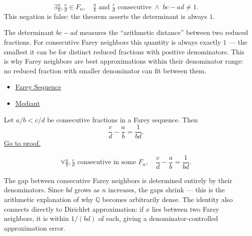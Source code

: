 \begin{remark*}
\[
\exists \tfrac{a}{b}, \tfrac{c}{d} \in F_n,\quad
\tfrac{a}{b} \text{ and } \tfrac{c}{d} \text{ consecutive}
\;\land\; bc - ad \neq 1.
\]
This negation is false: the theorem asserts the determinant is always $1$.
\end{remark*}

\begin{remark*}[Interpretation]
The determinant $bc - ad$ measures the ``arithmetic distance'' between two
reduced fractions.  For consecutive Farey neighbors this quantity is always
exactly $1$ --- the smallest it can be for distinct reduced fractions with
positive denominators.  This is why Farey neighbors are best approximations
within their denominator range: no reduced fraction with smaller denominator
can fit between them.
\end{remark*}

\begin{dependencies}
\begin{itemize}
  \item \hyperref[def:farey-sequence]{Farey Sequence}
  \item \hyperref[def:mediant]{Mediant}
\end{itemize}
\end{dependencies}

\begin{theorem}
\label{thm:farey-gap}
Let $a/b < c/d$ be consecutive fractions in a Farey sequence.  Then
\[
\frac{c}{d} - \frac{a}{b} = \frac{1}{bd}.
\]
\hyperref[prf:farey-gap]{Go to proof.}
\end{theorem}

\begin{remark*}
\[
\forall \tfrac{a}{b}, \tfrac{c}{d} \text{ consecutive in some } F_n,\quad
\frac{c}{d} - \frac{a}{b} = \frac{1}{bd}.
\]
\end{remark*}

\begin{remark*}[Interpretation]
The gap between consecutive Farey neighbors is determined entirely by
their denominators.  Since $bd$ grows as $n$ increases, the gaps shrink ---
this is the arithmetic explanation of why $\mathbb{Q}$ becomes arbitrarily
dense.  The identity also connects directly to Dirichlet approximation:
if $x$ lies between two Farey neighbors, it is within $1/(bd)$ of each,
giving a denominator-controlled approximation error.
\end{remark*}

